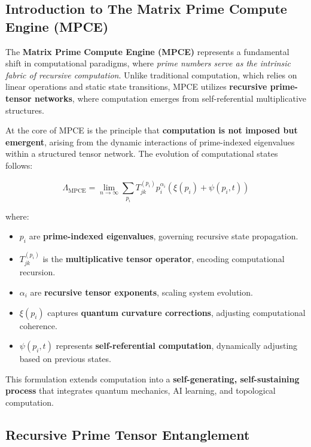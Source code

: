 \documentclass{article}
\theoremstyle{plain}
\theoremstyle{plain}
\theoremstyle{definition}
\theoremstyle{remark}
\begin{document}
\subsection{Introduction to The Matrix Prime Compute Engine (MPCE)}

The \textbf{Matrix Prime Compute Engine (MPCE)} represents a fundamental shift in computational paradigms, where \textit{prime numbers serve as the intrinsic fabric of recursive computation}. Unlike traditional computation, which relies on linear operations and static state transitions, MPCE utilizes \textbf{recursive prime-tensor networks}, where computation emerges from self-referential multiplicative structures. 

At the core of MPCE is the principle that \textbf{computation is not imposed but emergent}, arising from the dynamic interactions of prime-indexed eigenvalues within a structured tensor network. The evolution of computational states follows:

\begin{equation}
\Lambda_{\text{MPCE}} = \lim_{n\to\infty} \sum_{p_i} T^{(p_i)}_{jk} p_i^{\alpha_i} (\xi(p_i) + \psi(p_i, t))
\end{equation}

where:
\begin{itemize}
    \item $p_i$ are \textbf{prime-indexed eigenvalues}, governing recursive state propagation.
    \item $T^{(p_i)}_{jk}$ is the \textbf{multiplicative tensor operator}, encoding computational recursion.
    \item $\alpha_i$ are \textbf{recursive tensor exponents}, scaling system evolution.
    \item $\xi(p_i)$ captures \textbf{quantum curvature corrections}, adjusting computational coherence.
    \item $\psi(p_i, t)$ represents \textbf{self-referential computation}, dynamically adjusting based on previous states.
\end{itemize}

This formulation extends computation into a \textbf{self-generating, self-sustaining process} that integrates quantum mechanics, AI learning, and topological computation.

\subsection{Recursive Prime Tensor Entanglement}
\end{document}
